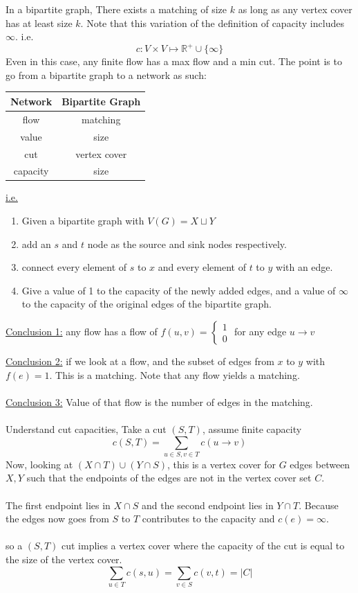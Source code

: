 \documentclass[12pt]{article}
\begin{document}
\begin{tcolorbox}[title=Theorem: (Konig)]
	In a bipartite graph, There exists a matching of size $k$ as long as any vertex cover has at least size $k$.
	\tcblower
	Note that this variation of the definition of capacity includes $\infty$. i.e.
	$$c: V \times V \mapsto \mathbb{R}^+ \cup \{ \infty \}$$
	Even in this case, any finite flow has a max flow and a min cut. The point is to go from a bipartite graph to a network as such:
	\begin{center}
 \begin{tabular}{||c c||} 
 \hline
 Network & Bipartite Graph \\ [0.5ex] 
 \hline\hline
 flow & matching \\ 
 \hline
 value & size  \\
 \hline
 cut & vertex cover   \\
 \hline
 capacity & size \\ [1ex] 
 \hline
\end{tabular}
\end{center}
\end{tcolorbox}
\underline{i.e.}
\begin{enumerate}
	\item{Given a bipartite graph with $V(G) = X \sqcup Y$}
	\item{add an $s$ and $t$ node as the source and sink nodes respectively.}
	\item{connect every element of $s$ to $x$ and every element of $t$ to $y$ with an edge.}
	\item{Give a value of 1 to the capacity of the newly added edges, and a value of $\infty$ to the capacity of the original edges of the bipartite graph. }
\end{enumerate}

\underline{Conclusion 1:} any flow has a flow of $f(u,v)=\begin{cases}
1\\
0
\end{cases}$ for any edge $u\rightarrow v$

\underline{Conclusion 2:} if we look at a flow, and the subset of edges from $x$ to $y$ with $f(e)=1$. This is a matching. Note that any flow yields a matching.\\
\\
\underline{Conclusion 3:} Value of that flow is the number of edges in the matching.\\
\\
Understand cut capacities, Take a cut $(S,T)$, assume finite capacity $$c(S,T) = \sum_{u\in S, v\in T} c(u\rightarrow v)$$
Now, looking at $(X\cap T)\cup(Y\cap S)$, this is a vertex cover for $G$ edges between $X,Y$ such that the endpoints of the edges are not in the vertex cover set $C$.\\
\\
The first endpoint lies in $X \cap S$ and the second endpoint lies in $Y \cap T$. Because the edges now goes from $S$ to $T$ contributes to the capacity and $c(e)=\infty$.\\
\\
so a $(S,T)$ cut implies a vertex cover where the capacity of the cut is equal to the size of the vertex cover.
$$\sum_{u\in T} c(s,u) = \sum_{v\in S} c(v,t) = |C|$$
\end{document}

